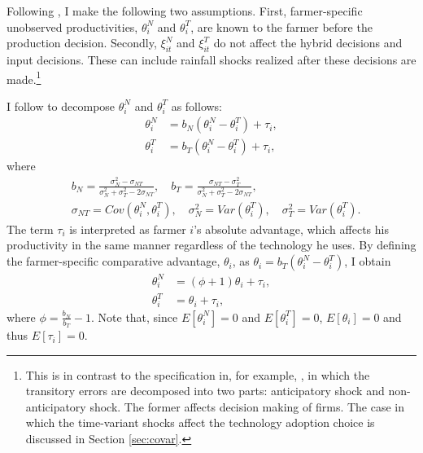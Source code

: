 \documentclass[11pt,letterpaper]{article}
\begin{document}
Following \citet{Suri11}, I make the following two assumptions.
First, farmer-specific unobserved productivities, $\theta_i^N$ and $\theta_i^T$, are known to the farmer before the production decision.
Secondly, $\xi_{it}^N$ and $\xi_{it}^T$ do not affect the hybrid decisions and input decisions.
These can include rainfall shocks realized after these decisions are made.\footnote{
  This is in contrast to the specification in, for example, \citet{OP96}, in which the transitory errors are decomposed into two parts: anticipatory shock and non-anticipatory shock.
  The former affects decision making of firms.
  The case in which the time-variant shocks affect the technology adoption choice is discussed in Section \ref{sec:covar}.
}

I follow \citet{Lemieux98} to decompose  $\theta_i^N$ and $\theta_i^T$ as follows:
\begin{align*}
  \theta_i^N &= b_N (\theta_i^N - \theta_i^T) + \tau_i, \\
  \theta_i^T &= b_T (\theta_i^N - \theta_i^T) + \tau_i,
\end{align*}
where
\begin{align*}
  &b_N = \frac{\sigma_N^2 - \sigma_{NT}}{\sigma_N^2 + \sigma_T^2 - 2 \sigma_{NT}},\quad b_T = \frac{\sigma_{NT} - \sigma_T^2}{\sigma_N^2 + \sigma_T^2 - 2 \sigma_{NT}}, \\
  &\sigma_{NT} = Cov(\theta_i^N, \theta_i^T),\quad \sigma_N^2 = Var(\theta_i^T),\quad \sigma_T^2 = Var(\theta_i^T).
\end{align*}
The term $\tau_i$ is interpreted as farmer $i$'s absolute advantage, which affects his productivity in the same manner regardless of the technology he uses.
By defining the farmer-specific comparative advantage, $\theta_i$, as $\theta_i = b_T (\theta_i^N - \theta_i^T)$, I obtain
\begin{align*}
  \theta_i^N &= (\phi + 1) \theta_i + \tau_i, \\
  \theta_i^T &= \theta_i + \tau_i,
\end{align*}
where $\phi = \frac{b_N}{b_T} - 1$.
Note that, since $E[\theta_i^N] = 0$ and $E[\theta_i^T] = 0$, $E[\theta_i] = 0$ and thus $E[\tau_i] = 0$.
\end{document}
